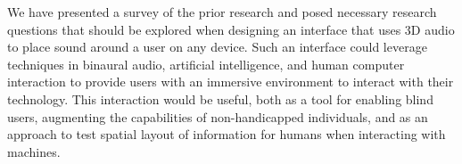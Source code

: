 We have presented a survey of the prior research and posed necessary research
questions that should be explored when designing an interface that uses 3D audio
to place sound around a user on any device. Such an interface could leverage
techniques in binaural audio, artificial intelligence, and human computer 
interaction to provide users with an immersive environment to interact with 
their technology. This interaction would be useful, both as a tool
for enabling blind users, augmenting the capabilities of non-handicapped
individuals, and as an approach to test spatial layout of information 
for humans when interacting with machines.

\newpage                                                  {}


